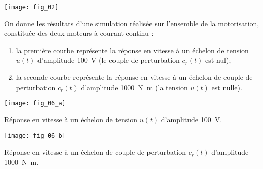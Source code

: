 



\begin{center}
	\texttt{[image: fig\_02]}
\end{center}



On donne les résultats d’une simulation réalisée sur l’ensemble de la motorisation, constituée des deux moteurs à courant continu :
\begin{enumerate}
\item la première courbe représente la réponse en vitesse à un échelon de tension $u(t)$ d’amplitude \SI{100}{V} (le couple de perturbation $c_r(t)$ est nul);
\item la seconde courbe représente la réponse en vitesse à un échelon de couple de perturbation $c_r(t)$ d’amplitude \SI{1000}{N.m} (la tension $u(t)$ est nulle).
\end{enumerate}



\begin{marginfigure}
\texttt{[image: fig\_06\_a]}

\caption{Réponse en vitesse à un échelon de tension $u(t)$ d’amplitude \SI{100}{V}.}
\end{marginfigure}

\begin{marginfigure}
\texttt{[image: fig\_06\_b]}

\caption{Réponse en vitesse à un échelon de couple de perturbation $c_r(t)$ d’amplitude \SI{1000}{N.m}.}
\end{marginfigure}





